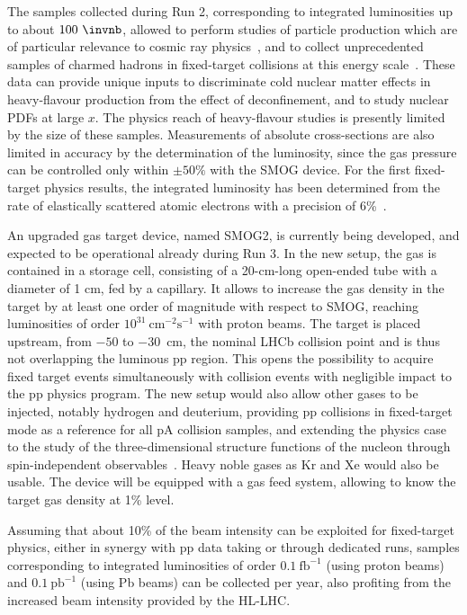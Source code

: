 \documentclass[../report.tex]{subfiles}
\begin{document}
The samples collected during Run 2, corresponding
to integrated luminosities up to about $100~\invnb$, 
allowed to perform 
studies of particle production which are of particular relevance
to cosmic ray physics~\cite{Aaij:2018svt}, and to
collect unprecedented samples of charmed hadrons in
fixed-target collisions at this energy
scale~\cite{Aaij:2018ogq}. 
These data can provide unique inputs to
discriminate cold nuclear matter effects in heavy-flavour production
from the effect of deconfinement, and to study nuclear PDFs 
at large $x$. The physics reach of heavy-flavour studies is presently
limited by the size of these samples. Measurements of absolute
cross-sections are also limited in accuracy by the determination of the
luminosity, since the gas pressure can be controlled only
within $\pm 50\%$ with the SMOG device. For the first fixed-target physics
results, the integrated luminosity has been determined from the rate of
elastically scattered atomic electrons with a precision of
6\%~\cite{Aaij:2018svt}. 

An upgraded gas target device, named SMOG2, is currently being developed, and expected
to be operational already during Run 3. 
In the new setup, the gas is contained in a storage cell, consisting
of a 20-cm-long open-ended tube with a diameter of 1 cm, fed by a capillary.
It allows to increase the gas density in the target
by at least one order of magnitude with respect to SMOG, reaching
luminosities of order $10^{31}~\text{cm}^{-2}\text{s}^{-1}$ with
proton beams.
The target is placed upstream, from $-50$ to $-30$~cm, the nominal  LHCb
collision point and is thus not overlapping the luminous pp region.
This opens the possibility to acquire fixed target events
simultaneously with collision events with negligible impact to the
pp physics program.
The new setup would also allow other gases to be injected, notably hydrogen and deuterium, providing
pp collisions in fixed-target mode as a reference for all pA
collision samples, and extending the physics case to the study
of the three-dimensional structure functions of the nucleon through
spin-independent observables~\cite{3dpdf}. Heavy noble gases as Kr
and Xe would also be usable.
The device will be equipped with a gas feed system, allowing
to know the target gas density at 1\% level.

Assuming that about 10\% of the beam intensity can be exploited for
fixed-target physics, either in synergy with pp data taking or through dedicated runs,
samples corresponding to integrated luminosities of order $0.1~\textrm{fb}^{-1}$
(using proton beams) and $0.1~\textrm{pb}^{-1}$ (using Pb beams) 
can be collected per year, also profiting from the increased beam
intensity provided by the HL-LHC.
\end{document}
